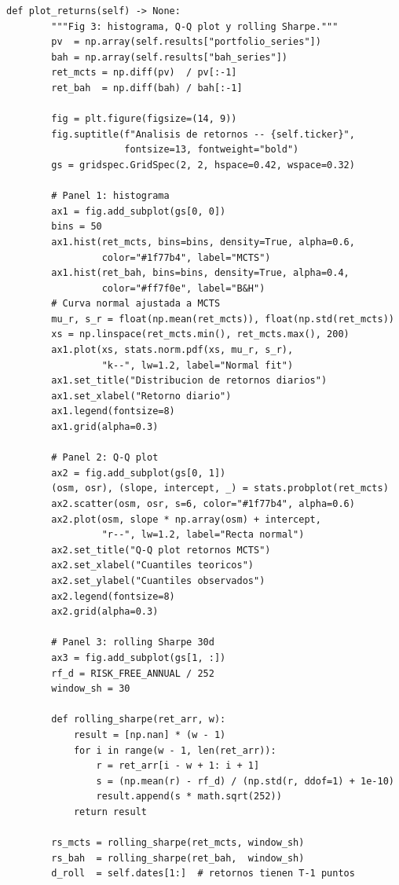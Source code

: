 \documentclass[12pt, a4paper]{article}
\begin{document}
\begin{lstlisting}[caption={Figura 3 -- retornos y rolling Sharpe}]
    def plot_returns(self) -> None:
        """Fig 3: histograma, Q-Q plot y rolling Sharpe."""
        pv  = np.array(self.results["portfolio_series"])
        bah = np.array(self.results["bah_series"])
        ret_mcts = np.diff(pv)  / pv[:-1]
        ret_bah  = np.diff(bah) / bah[:-1]

        fig = plt.figure(figsize=(14, 9))
        fig.suptitle(f"Analisis de retornos -- {self.ticker}",
                     fontsize=13, fontweight="bold")
        gs = gridspec.GridSpec(2, 2, hspace=0.42, wspace=0.32)

        # Panel 1: histograma
        ax1 = fig.add_subplot(gs[0, 0])
        bins = 50
        ax1.hist(ret_mcts, bins=bins, density=True, alpha=0.6,
                 color="#1f77b4", label="MCTS")
        ax1.hist(ret_bah, bins=bins, density=True, alpha=0.4,
                 color="#ff7f0e", label="B&H")
        # Curva normal ajustada a MCTS
        mu_r, s_r = float(np.mean(ret_mcts)), float(np.std(ret_mcts))
        xs = np.linspace(ret_mcts.min(), ret_mcts.max(), 200)
        ax1.plot(xs, stats.norm.pdf(xs, mu_r, s_r),
                 "k--", lw=1.2, label="Normal fit")
        ax1.set_title("Distribucion de retornos diarios")
        ax1.set_xlabel("Retorno diario")
        ax1.legend(fontsize=8)
        ax1.grid(alpha=0.3)

        # Panel 2: Q-Q plot
        ax2 = fig.add_subplot(gs[0, 1])
        (osm, osr), (slope, intercept, _) = stats.probplot(ret_mcts)
        ax2.scatter(osm, osr, s=6, color="#1f77b4", alpha=0.6)
        ax2.plot(osm, slope * np.array(osm) + intercept,
                 "r--", lw=1.2, label="Recta normal")
        ax2.set_title("Q-Q plot retornos MCTS")
        ax2.set_xlabel("Cuantiles teoricos")
        ax2.set_ylabel("Cuantiles observados")
        ax2.legend(fontsize=8)
        ax2.grid(alpha=0.3)

        # Panel 3: rolling Sharpe 30d
        ax3 = fig.add_subplot(gs[1, :])
        rf_d = RISK_FREE_ANNUAL / 252
        window_sh = 30

        def rolling_sharpe(ret_arr, w):
            result = [np.nan] * (w - 1)
            for i in range(w - 1, len(ret_arr)):
                r = ret_arr[i - w + 1: i + 1]
                s = (np.mean(r) - rf_d) / (np.std(r, ddof=1) + 1e-10)
                result.append(s * math.sqrt(252))
            return result

        rs_mcts = rolling_sharpe(ret_mcts, window_sh)
        rs_bah  = rolling_sharpe(ret_bah,  window_sh)
        d_roll  = self.dates[1:]  # retornos tienen T-1 puntos


\end{lstlisting}
\end{document}
